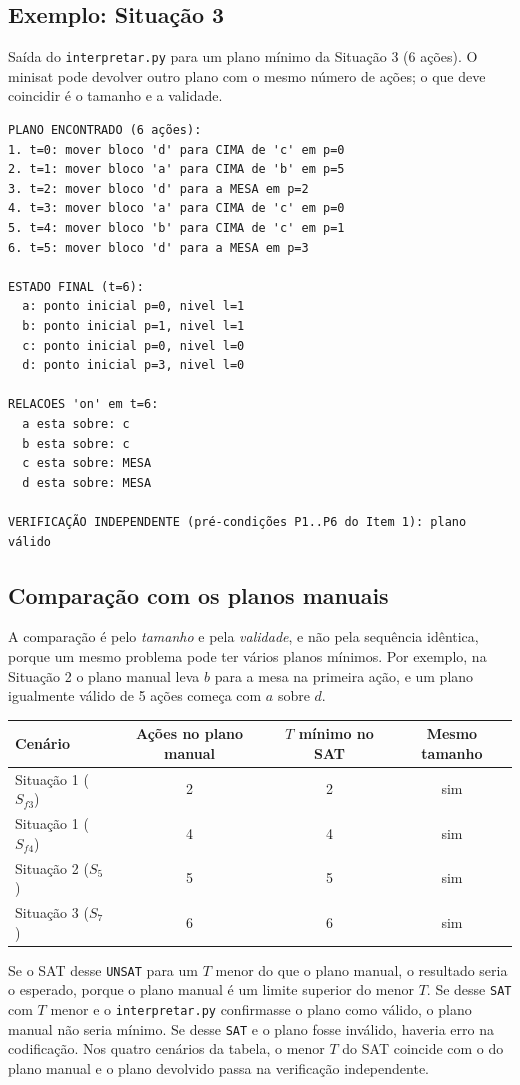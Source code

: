 \subsection{Exemplo: Situação 3}
Saída do \texttt{interpretar.py} para um plano mínimo da Situação 3 (6 ações). O minisat pode devolver outro plano com o mesmo número de ações; o que deve coincidir é o tamanho e a validade.
\begin{lstlisting}
PLANO ENCONTRADO (6 ações):
1. t=0: mover bloco 'd' para CIMA de 'c' em p=0
2. t=1: mover bloco 'a' para CIMA de 'b' em p=5
3. t=2: mover bloco 'd' para a MESA em p=2
4. t=3: mover bloco 'a' para CIMA de 'c' em p=0
5. t=4: mover bloco 'b' para CIMA de 'c' em p=1
6. t=5: mover bloco 'd' para a MESA em p=3

ESTADO FINAL (t=6):
  a: ponto inicial p=0, nivel l=1
  b: ponto inicial p=1, nivel l=1
  c: ponto inicial p=0, nivel l=0
  d: ponto inicial p=3, nivel l=0

RELACOES 'on' em t=6:
  a esta sobre: c
  b esta sobre: c
  c esta sobre: MESA
  d esta sobre: MESA

VERIFICAÇÃO INDEPENDENTE (pré-condições P1..P6 do Item 1): plano válido
\end{lstlisting}

\subsection{Comparação com os planos manuais}
A comparação é pelo \emph{tamanho} e pela \emph{validade}, e não pela sequência idêntica, porque um mesmo problema pode ter vários planos mínimos. Por exemplo, na Situação 2 o plano manual leva $b$ para a mesa na primeira ação, e um plano igualmente válido de 5 ações começa com $a$ sobre $d$.
\begin{center}
\begin{tabular}{l c c c}
\toprule
Cenário & Ações no plano manual & $T$ mínimo no SAT & Mesmo tamanho \\
\midrule
Situação 1 ($S_{f3}$) & 2 & 2 & sim \\
Situação 1 ($S_{f4}$) & 4 & 4 & sim \\
Situação 2 ($S_5$) & 5 & 5 & sim \\
Situação 3 ($S_7$) & 6 & 6 & sim \\
\bottomrule
\end{tabular}
\end{center}
Se o SAT desse \texttt{UNSAT} para um $T$ menor do que o plano manual, o resultado seria o esperado, porque o plano manual é um limite superior do menor $T$. Se desse \texttt{SAT} com $T$ menor e o \texttt{interpretar.py} confirmasse o plano como válido, o plano manual não seria mínimo. Se desse \texttt{SAT} e o plano fosse inválido, haveria erro na codificação. Nos quatro cenários da tabela, o menor $T$ do SAT coincide com o do plano manual e o plano devolvido passa na verificação independente.

